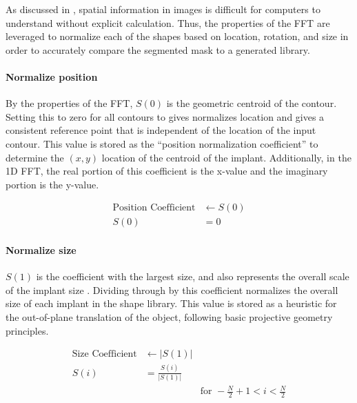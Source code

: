 As discussed in , spatial information in images is difficult for computers to understand without explicit calculation.
Thus, the properties of the FFT are leveraged to normalize each of the shapes based on location, rotation, and size in order to accurately compare the segmented mask to a generated library.

\paragraph*{Normalize position}
By the properties of the FFT, $S(0)$ is the geometric centroid of the contour.
Setting this to zero for all contours to gives normalizes location and gives a consistent reference point that is independent of the location of the input contour.
This value is stored as the ``position normalization coefficient'' to determine the $(x,y)$ location of the centroid of the implant.
Additionally, in the 1D FFT, the real portion of this coefficient is the x-value and the imaginary portion is the y-value.

\begin{equation}
    \begin{aligned}
        \text{Position Coefficient} &\leftarrow S(0) \\
        S(0) &= 0
    \end{aligned}
\end{equation}

\paragraph*{Normalize size}
$S(1)$ is the coefficient with the largest size, and also represents the overall scale of the implant size \cite{banksAccurateMeasurementThreedimensional1996}.
Dividing through by this coefficient normalizes the overall size of each implant in the shape library.
This value is stored as a heuristic for the out-of-plane translation of the object, following basic projective geometry principles.

\begin{equation}
    \begin{aligned}
        \text{Size Coefficient} &\leftarrow |S(1)| \\
        S(i) &= \frac{S(i)}{|S(1)|} & \\
        & & \text{for } -\frac{N}{2} + 1 < i < \frac{N}{2}
    \end{aligned}
\end{equation}


